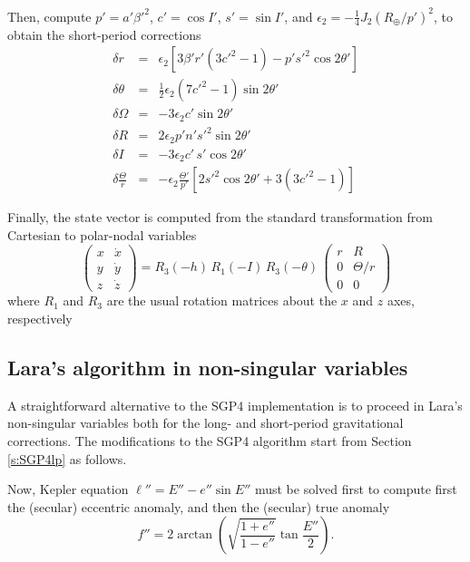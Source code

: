 \documentclass{article}
\begin{document}
Then, compute $p'=a'\beta'^2$, $c'=\cos{I}'$, $s'=\sin{I}'$, and $\epsilon_2=-\frac{1}{4}J_2(R_\oplus/p')^2$, to obtain the short-period corrections
\begin{eqnarray*}
\delta r &=& \epsilon_2\left[3\beta'r'(3c'^2-1)-p's'^2\cos2\theta'\right] \\
\delta \theta &=& \frac{1}{2}\epsilon_2(7c'^2-1)\sin{2\theta'} \\
\delta \Omega &=& -3\epsilon_2 c'\sin2\theta' \\
\delta R &=& 2\epsilon_2 p'n's'^2\sin2\theta' \\
\delta I &=& -3\epsilon_2 c'\,s'\cos2\theta' \\
\delta \frac{\Theta}{r} &=&
- \epsilon_2\frac{\Theta'}{p'}\left[2s'^2\cos2\theta'+3\left(3c'^2-1\right)\right]
\end{eqnarray*}


Finally, the state vector is computed from the standard transformation from Cartesian to polar-nodal variables
\[ %
\left(\begin{array}{cc} x & \dot{x} \\ y & \dot{y} \\ z & \dot{z} \end{array}\right)=
R_3(-h)\,{R}_1(-I)\,{R}_3(-\theta)\,\left(\begin{array}{cc} r & R \\ 0 & \Theta/r \\ 0 & 0 \end{array}\right)
\] %
where $R_1$ and $R_3$ are the usual rotation matrices about the $x$ and $z$ axes, respectively


\subsection{Lara's algorithm in non-singular variables} \label{sec:lara}

A straightforward alternative to the SGP4 implementation is to proceed in Lara's non-singular variables \cite{Lara2015MPE} both for the long- and short-period gravitational corrections. The modifications to the SGP4 algorithm start from Section \ref{s:SGP4lp} as follows.

Now, Kepler equation $\ell''=E''-e''\sin{E}''$ must be solved first to compute first the (secular) eccentric anomaly, and then the (secular) true anomaly
\[
f''=2\arctan\left(\sqrt{\frac{1+e''}{1-e''}}\tan\frac{E''}{2}\right).
\]
\par
\end{document}
